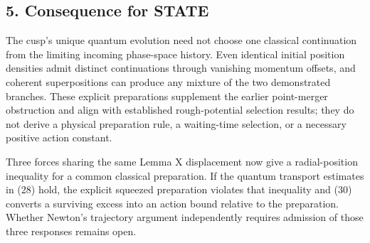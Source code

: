 \documentclass[11pt,a4paper]{article}
\begin{document}
\subsection{5. Consequence for STATE}\label{consequence-for-state}

The cusp's unique quantum evolution need not choose one classical
continuation from the limiting incoming phase-space history. Even
identical initial position densities admit distinct continuations
through vanishing momentum offsets, and coherent superpositions can
produce any mixture of the two demonstrated branches. These explicit
preparations supplement the earlier point-merger obstruction and align
with established rough-potential selection results; they do not derive a
physical preparation rule, a waiting-time selection, or a necessary
positive action constant.

Three forces sharing the same Lemma X displacement now give a
radial-position inequality for a common classical preparation. If the
quantum transport estimates in (28) hold, the explicit squeezed
preparation violates that inequality and (30) converts a surviving
excess into an action bound relative to the preparation. Whether
Newton's trajectory argument independently requires admission of those
three responses remains open.
\end{document}
